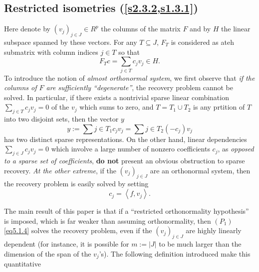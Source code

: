 \subsection{Restricted isometries (\cref{s2.3.2,s1.3.1})}
\label{s5.2.4}
Here denote by $(v_j)_{j \in J} \in R^p$ the columns of the matrix $F$ and by $H$ the linear subspace spanned by these vectors. For any $T \subseteq J$, $F_T$ is considered as ateh submatrix with column indices $j \in T$ so that
\begin{equation*}
    F_T c = \sum\limits_{j \in T} c_j v_j \in H.
\end{equation*}
To introduce the notion of \emph{almost orthonormal system}, we first observe that \emph{if the columns of $F$ are sufficiently ``degenerate''}, the recovery problem \textcolor[rgb]{1,0,0}{cannot be solved}. In particular, if there exists a nontrivial sparse linear combination $\sum_{j \in T}c_jv_j=0$ of the $v_j$ which sums to zero, and $T = T_1 \cup T_2$ is any prtition of $T$ into two disjoint sets, then the vector $y$
\begin{equation*}
    y := \sum\limits{j \in T_1}c_j v_j = \sum\limits{j \in T_2}(-c_j)v_j
\end{equation*}
has two distinct sparse representations.
On the other hand, linear dependencies $\sum_{j \in J}c_j v_j = 0$ which involve a large number of nonzero coefficients $c_j$, as \emph{opposed to a sparse set of coefficients}, \textbf{do not} present an obvious obstruction to sparse recovery. \emph{At the other extreme}, if the $(v_j)_{j \in J}$ are an orthonormal system, then the recovery problem is easily solved by setting
\[c_j = \left< f,v_j \right>.\]

The main result of this paper is that if a ``restricted orthonormality hypothesis'' is imposed, which is far weaker than assuming orthonormality, then $(P_1)$\cref{eq5.1.4} solves the recovery problem, even if the $(v_j)_{j \in J}$ are highly linearly dependent (for instance, it is possible for $m := |J|$ to be much larger than the dimension of the span of the $v_j$'s). The following definition introduced make this quantitative

